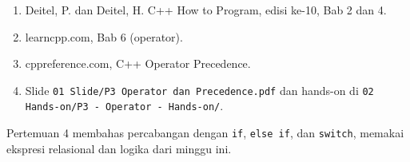 \documentclass[a4paper]{article}
\begin{document}
\begin{enumerate}
\item Deitel, P. dan Deitel, H. C++ How to Program, edisi ke-10, Bab 2 dan 4.
\item learncpp.com, Bab 6 (operator).
\item cppreference.com, C++ Operator Precedence.
\item Slide \texttt{01 Slide/P3 Operator dan Precedence.pdf} dan hands-on di \texttt{02 Hands-on/P3 - Operator - Hands-on/}.
\end{enumerate}
\begin{Penting}
Pertemuan 4 membahas percabangan dengan \texttt{if}, \texttt{else if}, dan \texttt{switch}, memakai ekspresi relasional dan logika dari minggu ini.
\end{Penting}
\end{document}
